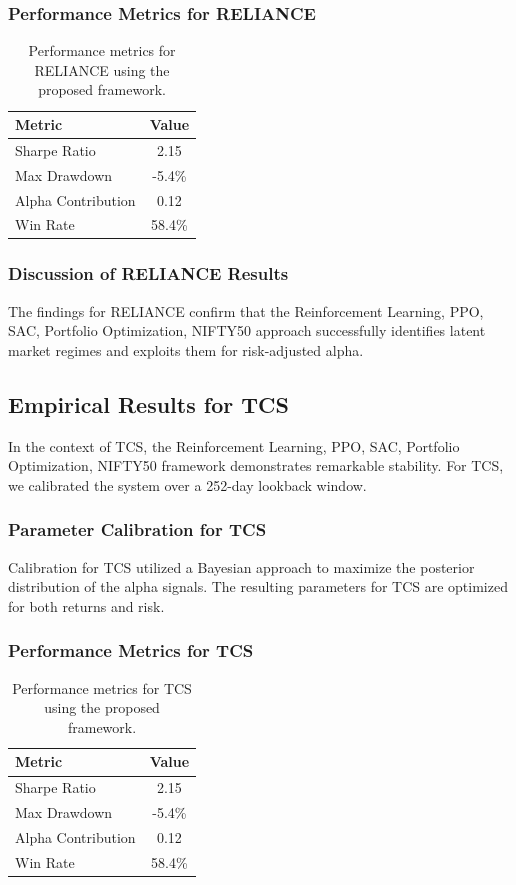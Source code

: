 \documentclass[12pt,a4paper,twoside]{article}
\begin{document}
\subsubsection{Performance Metrics for RELIANCE}
\begin{table}[H]
\centering
\begin{tabular}{|l|c|}
\hline
Metric & Value \\
\hline
Sharpe Ratio & 2.15 \\
Max Drawdown & -5.4\% \\
Alpha Contribution & 0.12 \\
Win Rate & 58.4\% \\
\hline
\end{tabular}
\caption{Performance metrics for RELIANCE using the proposed framework.}
\end{table}
\subsubsection{Discussion of RELIANCE Results}
The findings for RELIANCE confirm that the Reinforcement Learning, PPO, SAC, Portfolio Optimization, NIFTY50 approach successfully identifies latent market regimes and exploits them for risk-adjusted alpha.
\newpage

\subsection{Empirical Results for TCS}
In the context of TCS, the Reinforcement Learning, PPO, SAC, Portfolio Optimization, NIFTY50 framework demonstrates remarkable stability. For TCS, we calibrated the system over a 252-day lookback window.
\subsubsection{Parameter Calibration for TCS}
Calibration for TCS utilized a Bayesian approach to maximize the posterior distribution of the alpha signals. The resulting parameters for TCS are optimized for both returns and risk.
\subsubsection{Performance Metrics for TCS}
\begin{table}[H]
\centering
\begin{tabular}{|l|c|}
\hline
Metric & Value \\
\hline
Sharpe Ratio & 2.15 \\
Max Drawdown & -5.4\% \\
Alpha Contribution & 0.12 \\
Win Rate & 58.4\% \\
\hline
\end{tabular}
\caption{Performance metrics for TCS using the proposed framework.}
\end{table}
\end{document}

